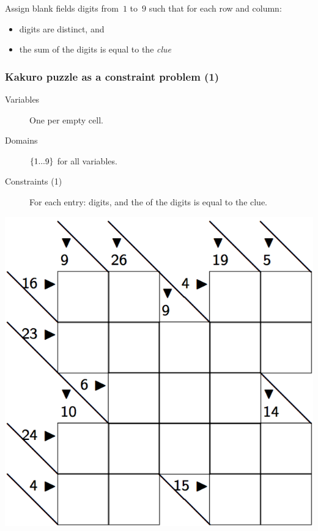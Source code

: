 \documentclass{beamer}
\newcommand{\stressed}[1]{\emph{{\color{red!50}{#1}}}}
\begin{document}
\begin{frame}
  \bigskip

  Assign blank fields digits from~$1$ to~$9$ such that for each row and column:
  \begin{itemize}
    \item digits are distinct, and
    \item the sum of the digits is equal to the \emph{clue}
    \end{itemize}

\end{frame}

\begin{frame}
  \frametitle{Kakuro puzzle as a constraint problem (1)}
  \begin{minipage}{0.5\textwidth}
    \begin{description}
      \item[Variables] One per empty cell.
      \item[Domains] $\left\{1...9\right\}$ for all variables.
      \item[Constraints (1)] For each entry: \stressed{distinct} digits,
        and the \stressed{sum} of the digits is equal to the clue.
    \end{description} 
  \end{minipage}
  \begin{minipage}{0.45\textwidth}
    \includegraphics[scale=0.2]{kakuro.png}
  \end{minipage}
\end{frame}
\end{document}
